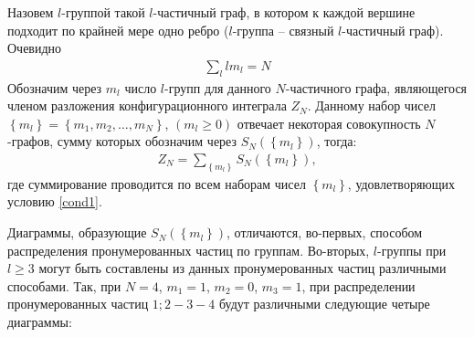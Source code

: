 Назовем $l$-группой такой $l$-частичный граф, в котором к каждой вершине подходит по крайней мере одно ребро ($l$-группа -- связный $l$-частичный граф). Очевидно
\vverh
\begin{gather}
	\sum_l l m_l = N \label{cond1}
\end{gather}
Обозначим через $m_l$ число $l$-групп для данного $N$-частичного графа, являющегося членом разложения конфигурационного интеграла $Z_N$. Данному набор чисел $\left\{ m_l \right\} = \left\{ m_1 , m_2 , \dots, m_N \right\}$, $( m_l \geqslant 0 )$ отвечает некоторая совокупность $N$-графов, сумму которых обозначим через $S_N \left( \left\{ m_l \right\} \right)$, тогда:
\vverh
\begin{gather}
	Z_N = \sum_{ \left\{ m_l \right\} } S_N \left( \left\{ m_l \right\} \right), \label{confsum}
\end{gather}
где суммирование проводится по всем наборам чисел $\left\{ m_l \right\}$, удовлетворяющих условию \eqref{cond1}. \par
Диаграммы, образующие $S_N \left( \left\{ m_l \right\} \right)$, отличаются, во-первых, способом распределения пронумерованных частиц по группам. Во-вторых, $l$-группы при $l \geqslant 3$ могут быть составлены из данных пронумерованных частиц различными способами. Так, при $N=4$, $m_1 = 1$, $m_2 = 0$, $m_3 = 1$, при распределении пронумерованных частиц $1; 2-3-4$ будут различными следующие четыре диаграммы:
\vverh
